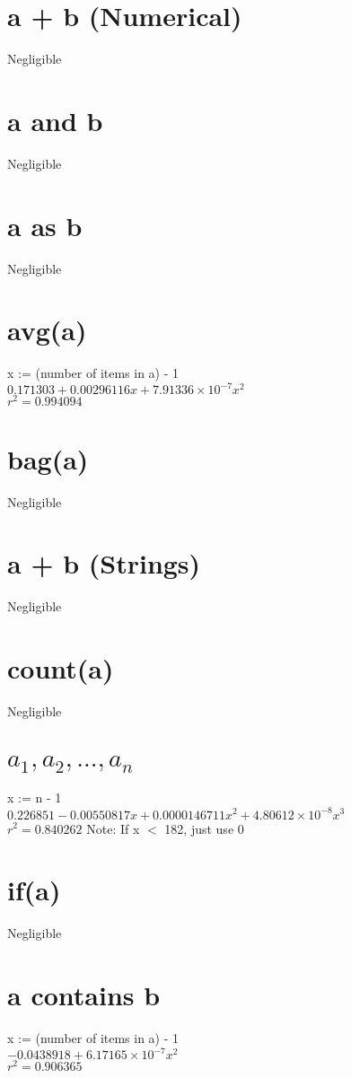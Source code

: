 \documentclass[12pt]{article}
\begin{document}
	\section{a + b (Numerical)}
	Negligible
	
	\section{a and b}
	Negligible
	
	\section{a as b}
	Negligible
	
	\section{avg(a)}
	x := (number of items in a) - 1\\
	$0.171303 + 0.00296116x + 7.91336 \times 10^{-7} x^2$\\
	$r^2 = 0.994094$

	\section{bag(a)}
	Negligible
	
	\section{a + b (Strings)}
	Negligible
	
	\section{count(a)}
	Negligible
	
	\section{$a_1, a_2, ..., a_n$}
	x := n - 1\\
	$0.226851 - 0.00550817x + 0.0000146711x^2 + 4.80612 \times 10^{-8} x^3$\\
	$r^2 = 0.840262$
	Note: If x $<$ 182, just use 0
	
	\section{if(a)}
	Negligible
	
	\section{a contains b}
	x := (number of items in a) - 1\\
	$-0.0438918 + 6.17165 \times 10^{-7} x^2$\\
	$r^2 = 0.906365$
	
\end{document}
